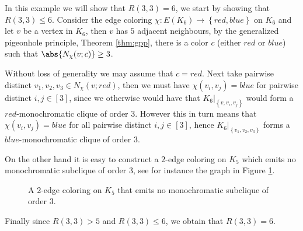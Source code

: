 \begin{example}\label{exmp:R3_3}
	In this example we will show that $R(3, 3) = 6$, we start by showing that $R(3, 3) \leq 6$. Consider the edge coloring $\chi: E(K_{6}) \to \left\{red, blue\right\}$ on $K_6$ and let $v$ be a vertex in $K_6$, then $v$ has $5$ adjacent neighbours, by the generalized pigeonhole principle, Theorem \ref{thm:gpp}, there is a color $c$ (either $red$ or $blue$) such that $\abs{N_{\chi}(v; c)} \geq 3$.

	Without loss of generality we may assume that $c = red$. Next take pairwise distinct $v_1, v_2, v_3 \in N_{\chi}(v; red)$, then we must have $\chi(v_{i}, v_{j}) = blue$ for pairwise distinct $i, j \in [3]$, since we otherwise would have that $K_{6} |_{\left\{v, v_i, v_j\right\}}$ would form a $red$-monochromatic clique of order $3$. However this in turn means that $\chi(v_i, v_j) = blue$ for all pairwise distinct $i, j \in [3]$, hence $K_6 |_{\left\{v_1, v_2, v_3\right\}}$ forms a $blue$-monochromatic clique of order $3$.

    On the other hand it is easy to construct a $2$-edge coloring on $K_5$ which emits no monochromatic subclique of order $3$, see for instance the graph in Figure \ref{fig:K5_counter_example}.
    \begin{figure}[H]
  \centering
  \caption{A 2-edge coloring on $K_{5}$ that emits no monochromatic subclique of order $3$.}
  \label{fig:K5_counter_example}
\end{figure}
Finally since $R(3, 3) > 5$ and $R(3, 3) \leq 6$, we obtain that $R(3, 3) = 6$.
\end{example}
